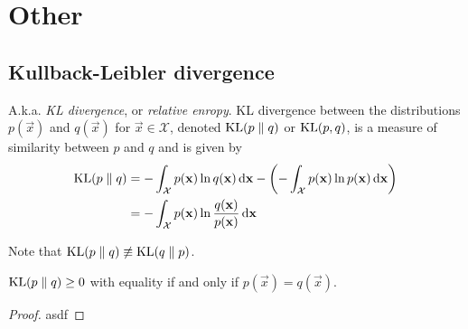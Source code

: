 \section{Other}
\subsection{Kullback-Leibler divergence}
A.k.a. \emph{KL divergence}, or \emph{relative enropy}. KL divergence between the distributions $p(\vec x)$ and $q(\vec x)$ for $\vec x \in \mathcal X$, denoted $\operatorname{KL}(p \parallel q)$ or $\operatorname{KL}(p, q)$, is a measure of similarity between $p$ and $q$ and is given by
\begin{align}
    \operatorname{KL}(p \parallel q)  &= -\int_{\mathcal X} p(\boldsymbol{\mathbf{x}}) \ln q(\boldsymbol{\mathbf{x}}) \,\mathrm d\boldsymbol{\mathbf{x}} - \left(-\int_{\mathcal X} p(\boldsymbol{\mathbf{x}}) \ln p(\boldsymbol{\mathbf{x}}) \,\mathrm d\boldsymbol{\mathbf{x}}\right) \nonumber\\
                        &= -\int_{\mathcal X} p(\boldsymbol{\mathbf{x}}) \ln \frac{q(\boldsymbol{\mathbf{x}})}{p(\boldsymbol{\mathbf{x}})} \,\mathrm d\boldsymbol{\mathbf{x}}
\end{align}

Note that $\operatorname{KL}(p \parallel q) \not\equiv \operatorname{KL}(q \parallel p)$.

\begin{claim}
    $\operatorname{KL}(p \parallel q) \geq 0$ with equality if and only if $p(\vec x) = q(\vec x)$.
\end{claim}

\begin{proof}
    asdf
\end{proof}